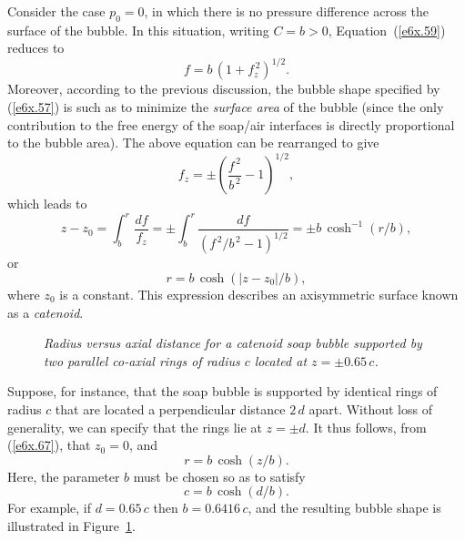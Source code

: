 Consider the case $p_0=0$, in which there is no pressure difference across the surface of the bubble. 
In this situation, writing
$C=b>0$, Equation~(\ref{e6x.59}) reduces to
\begin{equation}\label{e6x.57}
f = b\,(1+f_z^{\,2})^{1/2}.
\end{equation}
Moreover,  according to the previous discussion, the bubble shape specified by (\ref{e6x.57}) is such as to  minimize  the {\em surface area}\/ of the bubble (since the only contribution to the free energy of the soap/air interfaces is directly proportional
to the bubble area). 
The above equation can be rearranged to give
\begin{equation}
f_z=\pm \left(\frac{f^{\,2}}{b^{\,2}}-1\right)^{1/2},
\end{equation}
which leads to
\begin{equation}
z-z_0 = \int_b^r\,\frac{df}{f_z} = \pm\int_b^r\frac{df}{(f^{\,2}/b^{\,2}-1)^{1/2}}=\pm b\,\cosh^{-1}(r/b),
\end{equation}
or
\begin{equation}\label{e6x.67}
r = b\,\cosh(|z-z_0|/b),
\end{equation}
where $z_0$ is a constant. 
This expression describes an axisymmetric surface known as a {\em catenoid}. 

\begin{figure}
\epsfysize=3.5in
\centerline{}
\caption{\em Radius  versus axial distance for a catenoid soap bubble supported by two parallel co-axial rings
of radius $c$ located at $z=\pm 0.65\,c$.}\label{f6x.07}
\end{figure}

Suppose, for instance, that the soap bubble is
supported by identical rings of radius $c$ that are located a perpendicular
distance $2\,d$ apart. Without loss of generality, we can specify that the rings lie at $z=\pm d$. It thus follows,
from (\ref{e6x.67}), that $z_0=0$, and
\begin{equation}\label{e6x.61}
r = b\,\cosh(z/b).
\end{equation}
Here, the parameter $b$ must be chosen so as to satisfy
\begin{equation}
c = b\,\cosh(d/b).
\end{equation}
For example, if $d=0.65\,c$ then $b=0.6416\,c$, and the resulting  bubble shape is illustrated in Figure~\ref{f6x.07}. 

